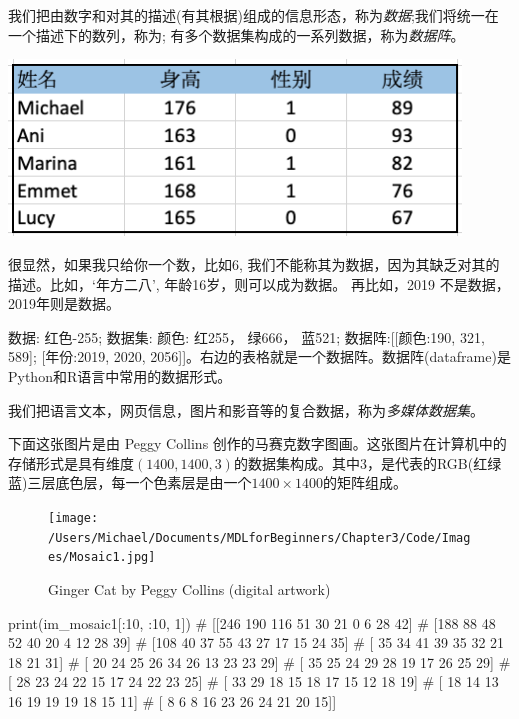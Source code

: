 \documentclass[12pt]{article}
\numberwithin{figure}{section}
\numberwithin{equation}{section}
\begin{document}
\begin{definition}
	我们把由数字和对其的描述(有其根据)组成的信息形态，称为\textit{数据};我们将统一在一个描述下的数列，称为; 有多个数据集构成的一系列数据，称为\textit{数据阵}。
\end{definition}
\begin{marginfigure}
	\centering
	\includegraphics[width=0.9\textwidth]{fig/dataframeEx}
\end{marginfigure}
\begin{remark}
很显然，如果我只给你一个数，比如6, 我们不能称其为数据，因为其缺乏对其的描述。比如，`年方二八’, 年龄16岁，则可以成为数据。	再比如，2019 不是数据，2019年则是数据。
\end{remark}

\begin{example}
数据: 红色-255; 数据集: 颜色: 红255， 绿666， 蓝521; 数据阵:[[颜色:190, 321, 589]; [年份:2019, 2020, 2056]]。右边的表格就是一个数据阵。数据阵(dataframe)是Python和R语言中常用的数据形式。
\end{example}

\begin{definition}
	我们把语言文本，网页信息，图片和影音等的复合数据，称为\textit{多媒体数据集}。
\end{definition}

\begin{example}
下面这张图片是由 Peggy Collins 创作的马赛克数字图画。这张图片在计算机中的存储形式是具有维度$(1400, 1400, 3)$的数据集构成。其中3，是代表的RGB(红绿蓝)三层底色层，每一个色素层是由一个$1400 \times 1400$的矩阵组成。
\begin{figure}[H]
	\centering
	\texttt{[image: /Users/Michael/Documents/MDLforBeginners/Chapter3/Code/Images/Mosaic1.jpg]}
	\caption{Ginger Cat by Peggy Collins (digital artwork)}
\end{figure}	
\begin{python}
print(im_mosaic1[:10, :10, 1])
# [[246 190 116  51  30  21   0   6  28  42]
#  [188  88  48  52  40  20   4  12  28  39]
#  [108  40  37  55  43  27  17  15  24  35]
#  [ 35  34  41  39  35  32  21  18  21  31]
#  [ 20  24  25  26  34  26  13  23  23  29]
#  [ 35  25  24  29  28  19  17  26  25  29]
#  [ 28  23  24  22  15  17  24  22  23  25]
#  [ 33  29  18  15  18  17  15  12  18  19]
#  [ 18  14  13  16  19  19  19  18  15  11]
#  [  8   6   8  16  23  26  24  21  20  15]]	
\end{python}
\end{example}
\end{document}
